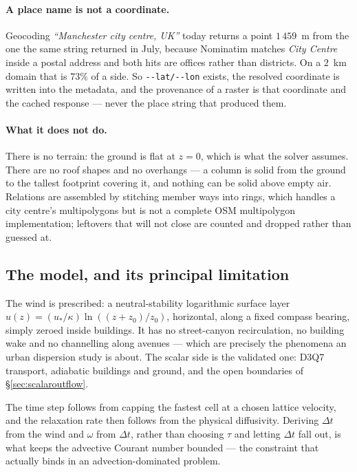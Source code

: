 \documentclass[11pt,a4paper]{article}
\newcommand{\code}[1]{\texttt{\small #1}}
\begin{document}
\paragraph{A place name is not a coordinate.} Geocoding
\emph{``Manchester city centre, UK''} today returns a point $1\,459$~m from
the one the same string returned in July, because Nominatim matches
\emph{City Centre} inside a postal address and both hits are offices rather
than districts. On a $2$~km domain that is $73\%$ of a side. So
\code{-{}-lat/-{}-lon} exists, the resolved coordinate is written into the
metadata, and the provenance of a raster is that coordinate and the cached
response --- never the place string that produced them.

\paragraph{What it does not do.} There is no terrain: the ground is flat at
$z=0$, which is what the solver assumes. There are no roof shapes and no
overhangs --- a column is solid from the ground to the tallest footprint
covering it, and nothing can be solid above empty air. Relations are assembled
by stitching member ways into rings, which handles a city centre's
multipolygons but is not a complete OSM multipolygon implementation; leftovers
that will not close are counted and dropped rather than guessed at.

\subsection{The model, and its principal limitation}

The wind is prescribed: a neutral-stability logarithmic surface layer
$u(z) = (u_*/\kappa)\ln((z+z_0)/z_0)$, horizontal, along a fixed compass
bearing, simply zeroed inside buildings. It has no street-canyon recirculation,
no building wake and no channelling along avenues --- which are precisely the
phenomena an urban dispersion study is about. The scalar side is the validated
one: D3Q7 transport, adiabatic buildings and ground, and the open boundaries of
\S\ref{sec:scalaroutflow}.

The time step follows from capping the fastest cell at a chosen lattice
velocity, and the relaxation rate then follows from the physical diffusivity.
Deriving $\Delta t$ from the wind and $\omega$ from $\Delta t$, rather than
choosing $\tau$ and letting $\Delta t$ fall out, is what keeps the advective
Courant number bounded --- the constraint that actually binds in an
advection-dominated problem.
\end{document}
